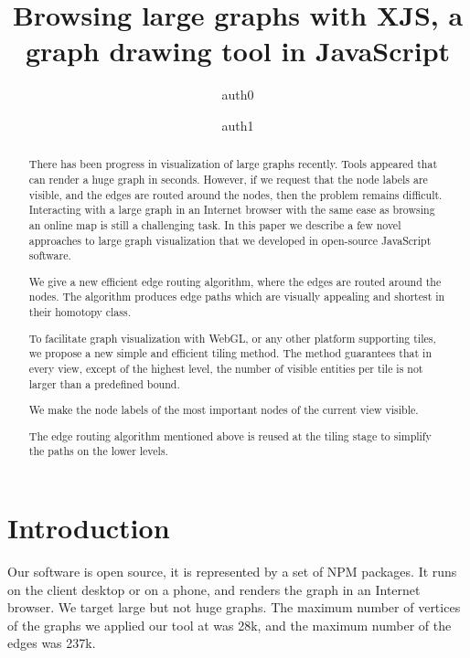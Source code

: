 \documentclass{gd-llncs}
\begin{document}
\title{Browsing large graphs with XJS, a graph drawing tool in JavaScript }
\author{%
  auth0  \and
  auth1
}%
\maketitle

\begin{abstract}
  There has been progress in visualization of large graphs recently. Tools appeared that can render a huge graph in seconds. However, if we request that the node labels are visible, and the edges are routed around the nodes, then the problem remains difficult. Interacting with a large graph in an Internet browser with the same ease as browsing an online map is still a challenging task.
  In this paper we describe a few novel approaches to large graph visualization that we developed in open-source JavaScript software.

  We give a new efficient edge routing algorithm, where the edges are routed around the nodes. The algorithm produces edge paths which are visually appealing and shortest in their homotopy class.

  To facilitate graph visualization with WebGL, or any other platform supporting tiles, we propose a new simple and efficient tiling method. The method guarantees that in every view, except of the highest level, the number of visible entities per tile is not larger than a predefined bound.

  We make the node labels of the most important nodes of the current view visible.

  The edge routing algorithm mentioned above is reused at the tiling stage to simplify the paths on the lower levels.
\end{abstract}


\section*{Introduction}

\label{sec:intro}
Our software is open source, it is represented by a set of NPM packages.
It runs on the client desktop or on a phone, and renders the graph in an Internet browser.
We target large but not huge graphs. The maximum number of vertices of the graphs we applied our tool at was 28k,
and the maximum number of the edges was 237k.
\end{document}
